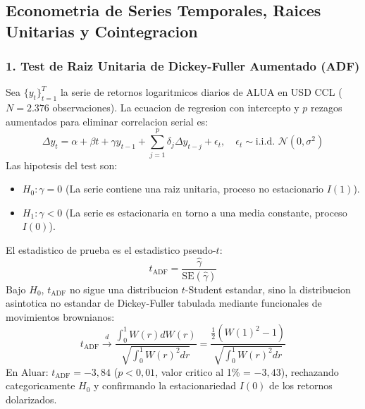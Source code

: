 \documentclass[10pt,a4paper]{article}
\theoremstyle{definition}
\begin{document}
\subsection{Econometria de Series Temporales, Raices Unitarias y Cointegracion}

\subsubsection{1. Test de Raiz Unitaria de Dickey-Fuller Aumentado (ADF)}
Sea $\{y_t\}_{t=1}^T$ la serie de retornos logaritmicos diarios de ALUA en USD CCL ($N=2.376$ observaciones). La ecuacion de regresion con intercepto y $p$ rezagos aumentados para eliminar correlacion serial es:
\begin{equation}
\Delta y_t = \alpha + \beta t + \gamma y_{t-1} + \sum_{j=1}^p \delta_j \Delta y_{t-j} + \epsilon_t, \quad \epsilon_t \sim \text{i.i.d. } \mathcal{N}(0, \sigma^2)
\end{equation}
Las hipotesis del test son:
\begin{itemize}
    \item $H_0: \gamma = 0$ (La serie contiene una raiz unitaria, proceso no estacionario $I(1)$).
    \item $H_1: \gamma < 0$ (La serie es estacionaria en torno a una media constante, proceso $I(0)$).
\end{itemize}
El estadistico de prueba es el estadistico pseudo-$t$:
\begin{equation}
t_{\text{ADF}} = \frac{\hat{\gamma}}{\text{SE}(\hat{\gamma})}
\end{equation}
Bajo $H_0$, $t_{\text{ADF}}$ no sigue una distribucion $t$-Student estandar, sino la distribucion asintotica no estandar de Dickey-Fuller tabulada mediante funcionales de movimientos brownianos:
\begin{equation}
t_{\text{ADF}} \xrightarrow{d} \frac{\int_0^1 W(r) dW(r)}{\sqrt{\int_0^1 W(r)^2 dr}} = \frac{\frac{1}{2}(W(1)^2 - 1)}{\sqrt{\int_0^1 W(r)^2 dr}}
\end{equation}
En Aluar: $t_{\text{ADF}} = -3,84$ ($p < 0,01$, valor critico al 1\% = $-3,43$), rechazando categoricamente $H_0$ y confirmando la estacionariedad $I(0)$ de los retornos dolarizados.
\end{document}
